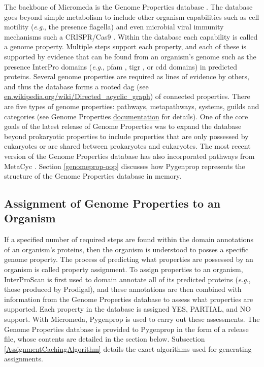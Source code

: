 The backbone of Micromeda is the Genome Properties database \cite{Haft2013}. The 
database goes beyond simple metabolism to include other organism capabilities 
such as cell motility (\textit{e}.\textit{g}., the presence flagella) and even microbial viral 
immunity mechanisms such a CRISPR/Cas9 \cite{horvath2010crispr}. Within the 
database each capability is called a genome property. Multiple steps support 
each property, and each of these is supported by evidence that can be found from 
an organism's genome such as the presence InterPro domains (\textit{e}.\textit{g}., \gls{pfam} 
\cite{bateman2004pfam}, \gls{tigr} \cite{haft2001tigrfams}, or \gls{cdd} 
\cite{marchler2014cdd} domains) in predicted proteins. Several genome properties 
are required as lines of evidence by others, and thus the database forms a 
rooted \gls{dag} (see 
\href{http://en.wikipedia.org/wiki/Directed_acyclic_graph}{en.wikipedia.org/wiki/Directed\_acyclic\_graph}) 
of connected properties. There are five types of genome properties: pathways, 
metapathways, systems, guilds and categories (see Genome Properties 
\href{https://genome-properties.readthedocs.io/en/latest/flatfile.html#genome-property-types}{documentation} 
for details). One of the core goals of the latest release of Genome Properties 
was to expand the database beyond prokaryotic properties to include properties 
that are only possessed by eukaryotes or are shared between prokaryotes and 
eukaryotes. The most recent version of the Genome Properties database has also 
incorporated pathways from MetaCyc \cite{karp2002metacyc}. Section 
\ref{genomeprop-oop} discusses how Pygenprop represents the structure of the 
Genome Properties database in memory.

\subsection{Assignment of Genome Properties to an Organism}

If a specified number of required steps are found within the domain annotations 
of an organism's proteins, then the organism is understood to posses a specific 
genome property. The process of predicting what properties are possessed by an 
organism is called property assignment. To assign properties to an organism, 
InterProScan is first used to domain annotate all of its predicted proteins 
(\textit{e}.\textit{g}., those produced by Prodigal), and these annotations are then combined with 
information from the Genome Properties database to assess what properties are 
supported. Each property in the database is assigned YES, PARTIAL, and NO 
support. With Micromeda, Pygenprop is used to carry out these assessments. The 
Genome Properties database is provided to Pygenprop in the form of a release 
file, whose contents are detailed in the section below. Subsection 
\ref{AssignmentCachingAlgorithm} details the exact algorithms used for 
generating assignments.  

